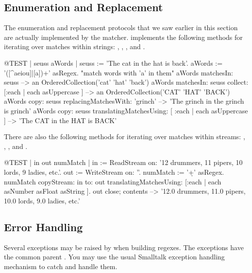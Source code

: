 \documentclass[a4paper,10pt,twoside]{book}
\begin{document}
{%
\subsection{Enumeration and Replacement}

The  enumeration and replacement protocols that we saw earlier in this section are actually implemented by the matcher.
 implements the following methods for iterating over matches within strings:
,
,
,
 and
.

\begin{code}{@TEST | seuss aWords |}
seuss := 'The cat in the hat is back'.
aWords := '\<([^aeiou]|[a])+\>' asRegex.    "match words with 'a' in them"
aWords matchesIn: seuss                                                                                     --> an OrderedCollection('cat' 'hat' 'back')
aWords matchesIn: seuss collect: [:each | each asUppercase ]                          --> an OrderedCollection('CAT' 'HAT' 'BACK')
aWords copy: seuss replacingMatchesWith: 'grinch'                                           --> 'The grinch in the grinch is grinch'
aWords copy: seuss translatingMatchesUsing: [ :each | each asUppercase ]     --> 'The CAT in the HAT is BACK'
\end{code}

There are also the following methods for iterating over matches within streams:
,
,
,
 and
.

\begin{code}{@TEST | in out numMatch |}
in := ReadStream on: '12 drummers, 11 pipers, 10 lords, 9 ladies, etc.'.
out := WriteStream on: ''.
numMatch := '\<\d+\>' asRegex.
numMatch
  copyStream: in
  to: out
  translatingMatchesUsing: [:each | each asNumber asFloat asString ].
out close; contents --> '12.0 drummers, 11.0 pipers, 10.0 lords, 9.0 ladies, etc.'
\end{code}


\subsection{Error Handling}

Several exceptions may be raised by  when building regexes.  The exceptions have the common parent .  You may use the usual Smalltalk exception handling mechanism to catch and handle them.

}
\end{document}
